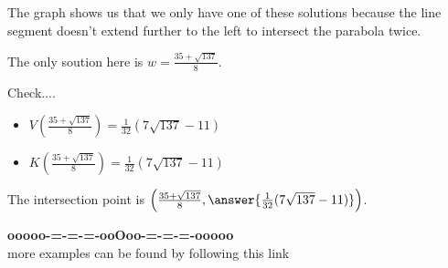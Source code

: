 \documentclass{ximera}
\begin{document}
The graph shows us that we only have one of these solutions because the line segment doesn't extend further to the left to intersect the parabola twice.


The only soution here is $w = \frac{35 + \sqrt{137}}{8} $.








Check....
\begin{itemize}
\item $V\left(\frac{35 + \sqrt{137}}{8}\right) =  \frac{1}{32}(7 \sqrt{137} - 11)  $




\item $K\left(\frac{35 + \sqrt{137}}{8}\right) =  \frac{1}{32}(7 \sqrt{137} - 11)  $
\end{itemize}

\begin{question}
The intersection point is $\left(\frac{35 + \sqrt{137}}{8}, \answer{\frac{1}{32}(7 \sqrt{137} - 11)} \right)$.
\end{question}
















\begin{center}
\textbf{\textcolor{green!50!black}{ooooo-=-=-=-ooOoo-=-=-=-ooooo}} \\

more examples can be found by following this link\\ 

\end{center}
\end{document}
